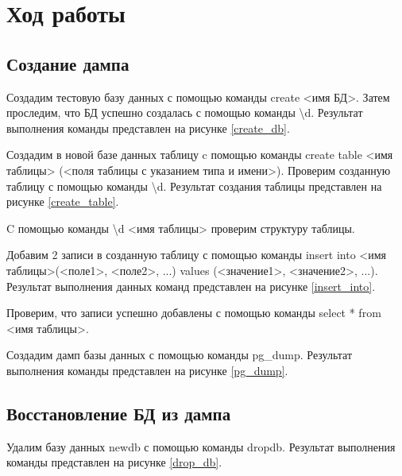 \section{Ход работы}

\subsection{Создание дампа}

Создадим тестовую базу данных с помощью команды create <имя БД>. Затем проследим, что БД успешно создалась с помощью команды  \textbackslash d. Результат выполнения команды представлен на рисунке \ref{create_db}.


Создадим в новой базе данных таблицу c помощью команды create table <имя таблицы> (<поля таблицы с указанием типа и имени>). Проверим созданную таблицу с помощью команды  \textbackslash d. Результат создания таблицы представлен на рисунке \ref{create_table}.


C помощью команды  \textbackslash d <имя таблицы> проверим структуру таблицы.


Добавим 2 записи в созданную таблицу с помощью команды insert into <имя таблицы>(<поле1>, <поле2>, ...) values (<значение1>, <значение2>, ...). Результат выполнения данных команд представлен на рисунке \ref{insert_into}.


Проверим, что записи успешно добавлены с помощью команды select * from <имя таблицы>.


Создадим дамп базы данных с помощью команды pg\_dump. Результат выполнения команды представлен на рисунке \ref{pg_dump}.


\newpage
\subsection{Восстановление БД из дампа}

Удалим базу данных newdb с помощью команды dropdb. Результат выполнения команды представлен на рисунке \ref{drop_db}.

